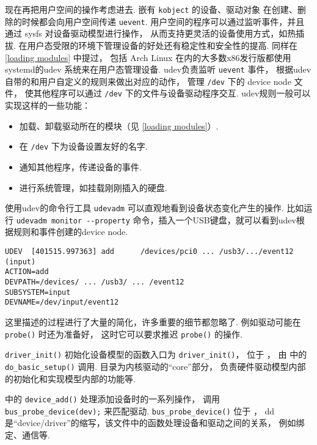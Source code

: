 现在再把用户空间的操作考虑进去.
嵌有 \lstinline{kobject} 的设备、驱动对象
在创建、删除的时候都会向用户空间传递 \lstinline{uevent}.
用户空间的程序可以通过监听事件，并且通过 sysfs 对设备驱动模型进行操作，
从而支持更灵活的设备使用方式，如热插拔.
在用户态受限的环境下管理设备的好处还有稳定性和安全性的提高.
同样在 \ref{loading modules} 中提过，
包括 Arch Linux 在内的大多数x86发行版都使用systemd的udev
系统来在用户态管理设备.
udev负责监听 \lstinline{uevent} 事件，
根据udev自带的和用户自定义的规则来做出对应的动作，
管理 \lstinline{/dev} 下的 device node 文件，
使其他程序可以通过 \lstinline{/dev} 下的文件与设备驱动程序交互.
udev规则一般可以实现这样的一些功能\cite{WritingUdev}：
\begin{itemize}
	\item 加载、卸载驱动所在的模块（见 \ref{loading modules}）.
	\item 在 \lstinline{/dev} 下为设备设置友好的名字.
	\item 通知其他程序，传递设备的事件.
	\item 进行系统管理，如挂载刚刚插入的硬盘.
\end{itemize}

使用udev的命令行工具 \lstinline{udevadm} 可以直观地看到设备状态变化产生的操作.
比如运行 \lstinline{udevadm monitor --property} 命令，插入一个USB键盘，就可以看到udev根据规则和事件创建的device node.

\begin{lstlisting}
UDEV  [401515.997363] add      /devices/pci0 ... /usb3/.../event12 (input)
ACTION=add
DEVPATH=/devices/ ... /usb3/ ... /event12
SUBSYSTEM=input
DEVNAME=/dev/input/event12
\end{lstlisting}

\begin{notebox}
	这里描述的过程进行了大量的简化，许多重要的细节都忽略了.
	例如驱动可能在 \lstinline{probe()} 时还为准备好，
	这时它可以要求推迟 \lstinline{probe()} 的操作.
\end{notebox}

\begin{readsrcbox}{\lstinline{driver_init()}}
	初始化设备模型的函数入口为 \lstinline{driver_init()}，
	位于 ，
	由  中的 \lstinline{do_basic_setup()} 调用.
	 目录为内核驱动的“core”部分，
	负责硬件驱动模型内部的初始化和实现模型内部的功能等.

	 中的 \lstinline{device_add()}
	处理添加设备时的一系列操作，
	调用 \lstinline{bus_probe_device(dev);} 来匹配驱动.
	\lstinline{bus_probe_device()} 位于 ，
	dd是“device/driver”的缩写，该文件中的函数处理设备和驱动之间的关系，
	例如绑定、通信等.
\end{readsrcbox}

